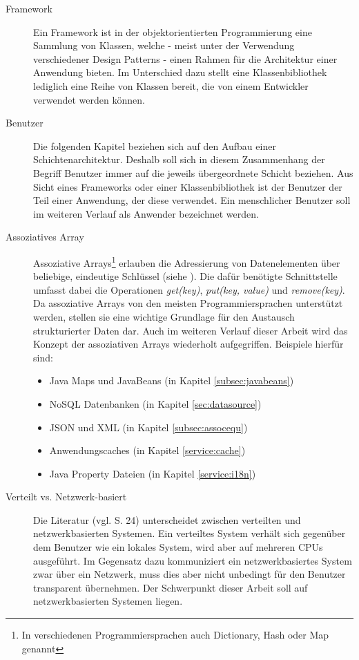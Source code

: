 \begin{description}
\item[Framework]\label{define:framework} Ein Framework ist in der
objektorientierten Programmierung eine Sammlung von Klassen, welche - meist unter
der Verwendung verschiedener Design Patterns - einen Rahmen für die Architektur
einer Anwendung bieten. Im Unterschied dazu stellt eine Klassenbibliothek
lediglich eine Reihe von Klassen bereit, die von einem Entwickler verwendet
werden können.
\item[Benutzer]\label{define:benutzer} Die folgenden Kapitel beziehen sich auf
den Aufbau einer Schichtenarchitektur. Deshalb soll sich in diesem Zusammenhang
der Begriff Benutzer immer auf die jeweils übergeordnete Schicht beziehen. Aus
Sicht eines Frameworks oder einer Klassenbibliothek ist der Benutzer der Teil
einer Anwendung, der diese verwendet. Ein menschlicher Benutzer soll im weiteren
Verlauf als Anwender bezeichnet werden.
\item[Assoziatives Array]\label{define:assocarray} Assoziative Arrays\footnote{In
verschiedenen Programmiersprachen auch Dictionary, Hash oder Map genannt}
erlauben die Adressierung von Datenelementen über beliebige, eindeutige
Schlüssel (siehe \cite{wiki:assocarray}). Die dafür benötigte Schnittstelle
umfasst dabei die Operationen \emph{get(key)}, \emph{put(key, value)} und
\emph{remove(key)}. Da assoziative Arrays von den meisten Programmiersprachen
unterstützt werden, stellen sie eine wichtige Grundlage für den Austausch
strukturierter Daten dar. Auch im weiteren Verlauf dieser Arbeit wird das Konzept
der assoziativen Arrays wiederholt aufgegriffen. Beispiele hierfür sind:
\begin{itemize}
  \item Java Maps und JavaBeans (in Kapitel \ref{subsec:javabeans})
  \item NoSQL Datenbanken (in Kapitel \ref{sec:datasource})
  \item JSON und XML (in Kapitel \ref{subsec:assocequ})
  \item Anwendungscaches (in Kapitel \ref{service:cache})
  \item Java Property Dateien (in Kapitel \ref{service:i18n})
\end{itemize}
\item[Verteilt vs. Netzwerk-basiert]\label{define:networkbased} Die Literatur
(vgl. \cite{fielding:2000} S. 24) unterscheidet zwischen verteilten und
netzwerkbasierten Systemen. Ein verteiltes System verhält sich gegenüber dem
Benutzer wie ein lokales System, wird aber auf mehreren CPUs ausgeführt. Im
Gegensatz dazu kommuniziert ein netzwerkbasiertes System zwar über ein Netzwerk,
muss dies aber nicht unbedingt für den Benutzer transparent übernehmen. Der
Schwerpunkt dieser Arbeit soll auf netzwerkbasierten Systemen liegen.
\end{description}

